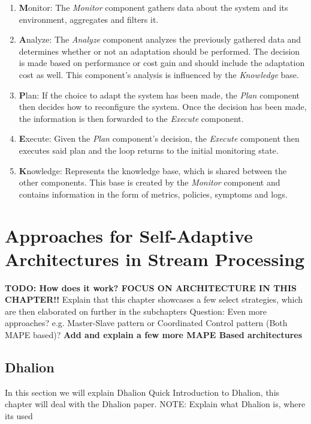     \begin{enumerate}
    \label{enum:mape}
        \item \textbf{M}onitor: 
            The \textit{Monitor} component gathers data about the system and its environment, aggregates and filters it.
        \item \textbf{A}nalyze: 
            The \textit{Analyze} component analyzes the previously gathered data and determines whether or not an adaptation should be performed.
            The decision is made based on performance or cost gain and should include the adaptation cost as well.
            This component's analysis is influenced by the \textit{Knowledge} base.
        \item \textbf{P}lan: 
            If the choice to adapt the system has been made, the \textit{Plan} component then decides how to reconfigure the system.
            Once the decision has been made, the information is then forwarded to the \textit{Execute} component.
        \item \textbf{E}xecute: 
            Given the \textit{Plan} component's decision, the \textit{Execute} component then executes said plan and the loop 
            returns to the initial monitoring state.
        \item \textbf{K}nowledge: 
            Represents the knowledge base, which is shared between the other components.
            This base is created by the \textit{Monitor} component and contains information in the form of metrics, policies, symptoms and logs.
    \end{enumerate}
   


\chapter{Approaches for Self-Adaptive Architectures in Stream Processing}
\label{cha:approaches}
\textbf{TODO: How does it work? FOCUS ON ARCHITECTURE IN THIS CHAPTER!!}
Explain that this chapter showcases a few select strategies, which are then elaborated on further in the subchapters
Question: Even more approaches? e.g. Master-Slave pattern or Coordinated Control pattern (Both MAPE based)?
\textbf{Add and explain a few more MAPE Based architectures}

    \section{Dhalion}
    \label{sec:dhalion}
    In this section we will explain Dhalion \cite{dhalion}
    Quick Introduction to Dhalion, this chapter will deal with the Dhalion paper.
    NOTE: Explain what Dhalion is, where its used

